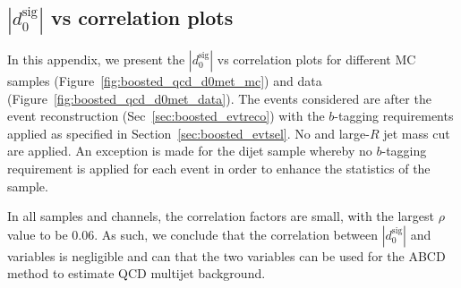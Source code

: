 %
%
\subsection{$|d_{0}^{\textrm{sig}}|$ vs \met correlation plots}
\label{app:boosted_qcd_d0met_plots}

In this appendix, we present the $|d_{0}^{\textrm{sig}}|$ vs \met correlation plots for different 
MC samples (Figure~\ref{fig:boosted_qcd_d0met_mc}) and data (Figure~\ref{fig:boosted_qcd_d0met_data}). 
The events considered are after the event reconstruction (Sec~\ref{sec:boosted_evtreco}) 
with the $b$-tagging requirements applied as specified in Section~\ref{sec:boosted_evtsel}. 
No \met and large-$R$ jet mass cut are applied. An exception is made for the dijet sample whereby 
no $b$-tagging requirement is applied for each event in order to enhance the statistics of the sample.

In all samples and channels, the correlation factors are small, with the largest $\rho$ value to be 0.06.
As such, we conclude that the correlation between $|d_{0}^{\textrm{sig}}|$ and \met variables is negligible
and can that the two variables can be used for the ABCD method to estimate QCD multijet background.

